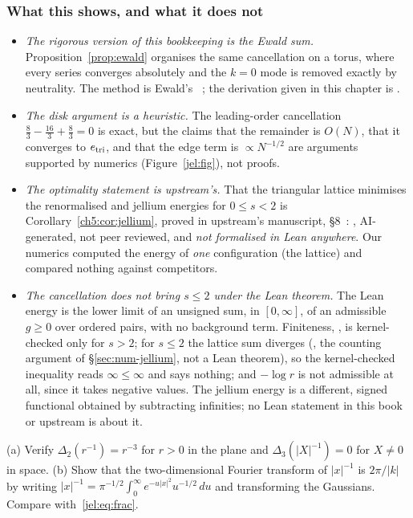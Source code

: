 \subsubsection{What this shows, and what it does not}\label{jel:status}
\begin{itemize}[leftmargin=*]
\item \emph{The rigorous version of this bookkeeping is the Ewald sum.} Proposition~\ref{prop:ewald} organises the same
  cancellation on a torus, where every series converges absolutely and the $k=0$ mode is removed exactly by
  neutrality. The method is Ewald's~\cite{ewald1921} \tierL; the derivation given in this chapter is \tierC.
\item \emph{The disk argument is a heuristic.} The leading-order cancellation $\frac83-\frac{16}3+\frac83=0$ is exact,
  but the claims that the remainder is $O(N)$, that it converges to $e_{\rm tri}$, and that the edge term is
  $\propto N^{-1/2}$ are \tierC{} arguments supported by \tierX{} numerics (Figure~\ref{jel:fig}), not proofs.
\item \emph{The optimality statement is upstream's.} That the triangular lattice minimises the renormalised and jellium
  energies for $0\le s<2$ is Corollary~\ref{ch5:cor:jellium}, proved in upstream's manuscript, \S8~\cite{oai}: \tierL,
  AI-generated, not peer reviewed, and \emph{not formalised in Lean anywhere}. Our numerics computed the energy of
  \emph{one} configuration (the lattice) and compared nothing against competitors.
\item \emph{The cancellation does not bring $s\le2$ under the Lean theorem.} The Lean energy  is the
  lower limit of an unsigned sum, in $[0,\infty]$, of an admissible $g\ge0$ over ordered pairs, with no background term.
  Finiteness, , is kernel-checked only for $s>2$; for $s\le2$ the lattice sum
  diverges (\tierC, the counting argument of \S\ref{sec:num-jellium}, not a Lean theorem), so the kernel-checked
  inequality reads $\infty\le\infty$ and says nothing; and $-\log r$ is not admissible at all, since it takes negative
  values. The jellium energy is a different, signed functional obtained by subtracting
  infinities; no Lean statement in this book or upstream is about it.
\end{itemize}

\begin{exercise}\label{jel:ex:frac}
(a) Verify $\Delta_2(r^{-1})=r^{-3}$ for $r>0$ in the plane and $\Delta_3(|X|^{-1})=0$ for $X\ne0$ in space.
(b) Show that the two-dimensional Fourier transform of $|x|^{-1}$ is $2\pi/|k|$ by writing
$|x|^{-1}=\pi^{-1/2}\int_0^\infty e^{-u|x|^2}u^{-1/2}\,du$ and transforming the Gaussians. Compare with~\eqref{jel:eq:frac}.
\end{exercise}

